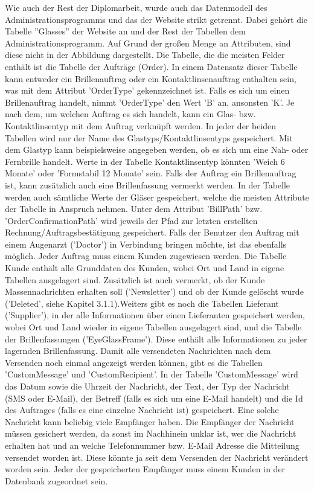 Wie auch der Rest der Diplomarbeit, wurde auch das Datenmodell des Administrationsprogramms und das der Website strikt getrennt. Dabei gehört die Tabelle ''Glasses'' der Website an und der Rest der Tabellen dem Administrationsprogramm. \newline Auf Grund der großen Menge an Attributen, sind diese nicht in der Abbildung dargestellt. \newline Die Tabelle, die die meisten Felder enthält ist die Tabelle der Aufträge (Order). In einem Datensatz dieser Tabelle kann entweder ein Brillenauftrag oder ein Kontaktlinsenauftrag enthalten sein,  was mit dem Attribut 'OrderType' gekennzeichnet ist. Falls es sich um einen Brillenauftrag handelt, nimmt 'OrderType' den Wert 'B' an, ansonsten 'K'. Je nach dem, um welchen Auftrag es sich handelt, kann ein Glas- bzw. Kontaktlinsentyp mit dem Auftrag verknüpft werden. In jeder der beiden Tabellen wird nur der Name des Glastyps/Kontaktlinsentyps gespeichert. Mit dem Glastyp kann beispielsweise angegeben werden, ob es sich um eine Nah- oder Fernbrille handelt. Werte in der Tabelle Kontaktlinsentyp könnten 'Weich 6 Monate' oder 'Formstabil 12 Monate' sein. \newline Falls der Auftrag ein Brillenauftrag ist, kann zusätzlich auch eine Brillenfassung vermerkt werden. In der Tabelle werden auch sämtliche Werte der Gläser gespeichert, welche die meisten Attribute der Tabelle in Anspruch nehmen. Unter dem Attribut 'BillPath' bzw. 'OrderConfirmationPath' wird jeweils der Pfad zur letzten erstellten Rechnung/Auftragsbestätigung gespeichert. Falls der Benutzer den Auftrag mit einem Augenarzt ('Doctor') in Verbindung bringen möchte, ist das ebenfalls möglich. \newline Jeder Auftrag muss einem Kunden zugewiesen werden. Die Tabelle Kunde enthält alle Grunddaten des Kunden, wobei Ort und Land in eigene Tabellen ausgelagert sind. Zusätzlich ist auch vermerkt, ob der Kunde Massennachrichten erhalten soll ('Newsletter') und ob der Kunde gelöscht wurde ('Deleted', siehe Kapitel 3.1.1).\newline Weiters gibt es noch die Tabellen Lieferant ('Supplier'), in der alle Informationen über einen Lieferanten gespeichert werden, wobei Ort und Land wieder in eigene Tabellen ausgelagert sind, und die Tabelle der Brillenfassungen ('EyeGlassFrame'). Diese enthält alle Informationen zu jeder lagernden Brillenfassung. \newline Damit alle versendeten Nachrichten nach dem Versenden noch einmal angezeigt werden können, gibt es die Tabellen 'CustomMessage' und 'CustomRecipient'. In der Tabelle 'CustomMessage' wird das Datum sowie die Uhrzeit der Nachricht, der Text, der Typ der Nachricht (SMS oder E-Mail), der Betreff (falls es sich um eine E-Mail handelt) und die Id des Auftrages (falls es eine einzelne Nachricht ist) gespeichert. Eine solche Nachricht kann beliebig viele Empfänger haben. Die Empfänger der Nachricht müssen gesichert werden, da sonst im Nachhinein unklar ist, wer die Nachricht erhalten hat und an welche Telefonnummer bzw. E-Mail Adresse die Mitteilung versendet worden ist. Diese könnte ja seit dem Versenden der Nachricht verändert worden sein. Jeder der gespeicherten  Empfänger muss einem Kunden in der Datenbank zugeordnet sein.
